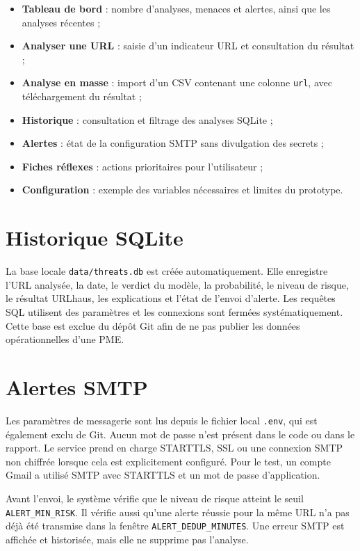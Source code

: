 \documentclass[11pt,a4paper]{report}
\begin{document}
\begin{itemize}
  \item \textbf{Tableau de bord} : nombre d'analyses, menaces et alertes,
        ainsi que les analyses récentes ;
  \item \textbf{Analyser une URL} : saisie d'un indicateur URL et consultation
        du résultat ;
  \item \textbf{Analyse en masse} : import d'un CSV contenant une colonne
        \texttt{url}, avec téléchargement du résultat ;
  \item \textbf{Historique} : consultation et filtrage des analyses SQLite ;
  \item \textbf{Alertes} : état de la configuration SMTP sans divulgation
        des secrets ;
  \item \textbf{Fiches réflexes} : actions prioritaires pour l'utilisateur ;
  \item \textbf{Configuration} : exemple des variables nécessaires et
        limites du prototype.
\end{itemize}

\section{Historique SQLite}

La base locale \texttt{data/threats.db} est créée automatiquement. Elle
enregistre l'URL analysée, la date, le verdict du modèle, la probabilité, le
niveau de risque, le résultat URLhaus, les explications et l'état de l'envoi
d'alerte. Les requêtes SQL utilisent des paramètres et les connexions sont
fermées systématiquement. Cette base est exclue du dépôt Git afin de ne pas
publier les données opérationnelles d'une PME.

\section{Alertes SMTP}

Les paramètres de messagerie sont lus depuis le fichier local \texttt{.env},
qui est également exclu de Git. Aucun mot de passe n'est présent dans le code
ou dans le rapport. Le service prend en charge STARTTLS, SSL ou une connexion
SMTP non chiffrée lorsque cela est explicitement configuré. Pour le test, un
compte Gmail a utilisé SMTP avec STARTTLS et un mot de passe d'application.

Avant l'envoi, le système vérifie que le niveau de risque atteint le seuil
\texttt{ALERT\_MIN\_RISK}. Il vérifie aussi qu'une alerte réussie pour la même
URL n'a pas déjà été transmise dans la fenêtre
\texttt{ALERT\_DEDUP\_MINUTES}. Une erreur SMTP est affichée et historisée,
mais elle ne supprime pas l'analyse.
\end{document}
